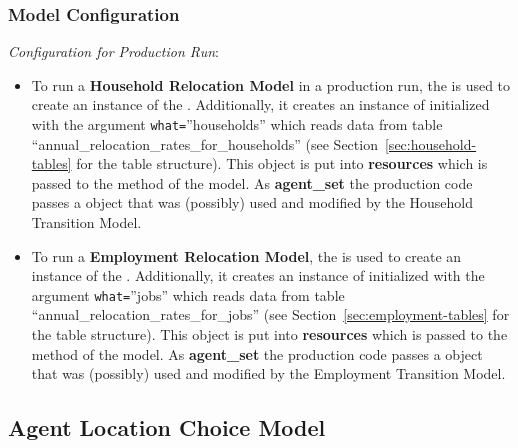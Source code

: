 \subsubsection{Model Configuration}
\modelsindex
%
{\em Configuration for Production Run}:
\begin{itemize}
\item To run a {\bf Household Relocation Model} \modelsindex in a production run, the
   \modelsindex is used to create an instance of the
  . \modelsindex Additionally, it creates an instance of
   initialized with the argument \verb|what=|''households''
  which reads data from table ``annual_relocation_rates_for_households'' (see
  Section~\ref{sec:household-tables} for the table structure). This object is
  put into {\bf resources} which is passed to the  method of
  the model. \modelsindex As {\bf agent_set} the production code passes a
   object that was (possibly) used and modified by the
  Household Transition Model. \modelsindex
\item To run a {\bf Employment Relocation Model}, \modelsindex the
   \modelsindex is used to create an instance of the
  . \modelsindex Additionally, it creates an instance of
   initialized with the argument \verb|what=|''jobs''
  which reads data from table ``annual_relocation_rates_for_jobs'' (see
  Section~\ref{sec:employment-tables} for the table structure). This object is
  put into {\bf resources} which is passed to the  method of
  the model. \modelsindex As {\bf agent_set} the production code passes a
   object that was (possibly) used and modified by the
  Employment Transition Model. \modelsindex
\end{itemize}

%
\subsection{Agent Location Choice Model}
\modelsindex
%
\label{sec:agent-lcm}

